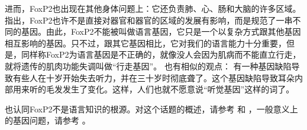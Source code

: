 %
进而，FoxP2也出现在其他身体问题上：它还负责肺、心、肠和大脑的许多区域\citep{MF2003a}。 \citet[--261]{MF2003a}指出，FoxP2也许不是直接对器官和器官的区域的发展有影响，而是规范了一串不同的基因。由此，FoxP2不能被叫做语言基因，它只是一个以复杂方式跟其他基因相互影响的基因。只不过，跟其它基因相比，它对我们的语言能力十分重要，但是，同样称FoxP2为语言基因是不正确的，就像没人会因为肌病而不能直立行走，就将遗传的肌肉功能失调叫做“行走基因”\citep[]{Bishop2002a}。 \citet[]{Karmiloff-Smith98a}也有相似的观点：
  有一种基因缺陷导致有些人在十岁开始失去听力，并在三十岁时彻底聋了。这个基因缺陷导致耳朵内部用来听的毛发发生了变化。这样，人们也就不愿意说“听觉基因”这样的词了。

 \citet*[]{FHC2005a}也认同FoxP2不是语言知识的根源。对这个话题的概述，请参考 和 ，一般意义上的基因问题，请参考 。

